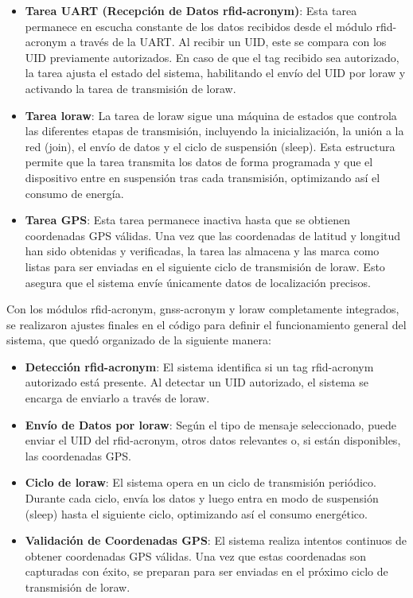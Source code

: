 \begin{itemize}
\item \textbf{Tarea UART (Recepción de Datos \acrshort{rfid-acronym})}: Esta tarea permanece en escucha constante de los datos recibidos desde el módulo \acrshort{rfid-acronym} a través de la UART. Al recibir un UID, este se compara con los UID previamente autorizados. En caso de que el tag recibido sea autorizado, la tarea ajusta el estado del sistema, habilitando el envío del UID por \acrshort{loraw} y activando la tarea de transmisión de \acrshort{loraw}.
\item \textbf{Tarea \acrshort{loraw}}: La tarea de \acrshort{loraw} sigue una máquina de estados que controla las diferentes etapas de transmisión, incluyendo la inicialización, la unión a la red (join), el envío de datos y el ciclo de suspensión (sleep). Esta estructura permite que la tarea transmita los datos de forma programada y que el dispositivo entre en suspensión tras cada transmisión, optimizando así el consumo de energía.
\item \textbf{Tarea GPS}: Esta tarea permanece inactiva hasta que se obtienen coordenadas GPS válidas. Una vez que las coordenadas de latitud y longitud han sido obtenidas y verificadas, la tarea las almacena y las marca como listas para ser enviadas en el siguiente ciclo de transmisión de \acrshort{loraw}. Esto asegura que el sistema envíe únicamente datos de localización precisos.
\end{itemize}


Con los módulos \acrshort{rfid-acronym}, \acrshort{gnss-acronym} y \acrshort{loraw} completamente integrados, se realizaron ajustes finales en el código para definir el funcionamiento general del sistema, que quedó organizado de la siguiente manera:


\begin{itemize}
\item \textbf{Detección \acrshort{rfid-acronym}}: El sistema identifica si un tag \acrshort{rfid-acronym} autorizado está presente. Al detectar un UID autorizado, el sistema se encarga de enviarlo a través de \acrshort{loraw}.
\item \textbf{Envío de Datos por \acrshort{loraw}}: Según el tipo de mensaje seleccionado, puede enviar el UID del \acrshort{rfid-acronym}, otros datos relevantes o, si están disponibles, las coordenadas GPS.
\item \textbf{Ciclo de \acrshort{loraw}}: El sistema opera en un ciclo de transmisión periódico. Durante cada ciclo, envía los datos y luego entra en modo de suspensión (sleep) hasta el siguiente ciclo, optimizando así el consumo energético.
\item \textbf{Validación de Coordenadas GPS}: El sistema realiza intentos continuos de obtener coordenadas GPS válidas. Una vez que estas coordenadas son capturadas con éxito, se preparan para ser enviadas en el próximo ciclo de transmisión de \acrshort{loraw}. 
\end{itemize}


